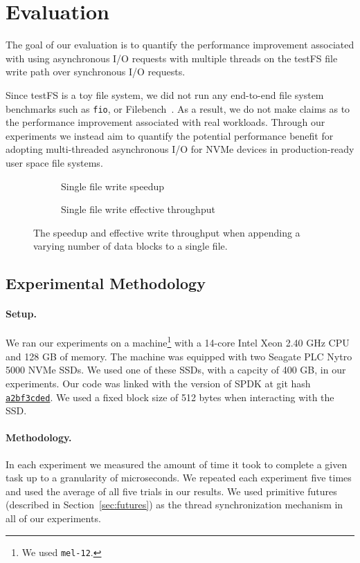 \section{Evaluation}
The goal of our evaluation is to quantify the performance improvement
associated with using asynchronous I/O requests with multiple threads on the
testFS file write path over synchronous I/O requests.

Since testFS is a toy file system, we did not run any end-to-end file system
benchmarks such as {\tt fio}, or Filebench~\cite{filebench-tarasov16}. As a
result, we do not make claims as to the performance improvement associated with
real workloads. Through our experiments we instead aim to quantify the
potential performance benefit for adopting multi-threaded asynchronous I/O for
NVMe devices in production-ready user space file systems.

\begin{figure*}
\begin{subfigure}[t]{0.5\linewidth}
  
  \caption{Single file write speedup}\label{fig:single-file-speedup}
\end{subfigure}
\begin{subfigure}[t]{0.5\linewidth}
  
  \caption{Single file write effective throughput}\label{fig:single-file-thpt}
\end{subfigure}
\caption{The speedup and effective write throughput when appending a varying
number of data blocks to a single file.}
\end{figure*}

\subsection{Experimental Methodology}
\paragraph{Setup.}
We ran our experiments on a machine\footnote{We used {\tt mel-12}.} with a
14-core Intel Xeon 2.40 GHz CPU and 128 GB of memory. The machine was equipped
with two Seagate PLC Nytro 5000 NVMe SSDs. We used one of these SSDs, with a
capcity of 400 GB, in our experiments. Our code was linked with the version of
SPDK at git hash
\href{https://github.com/spdk/spdk/commit/a2bf3cded37b7cc7e402eae80da90891f921b56d}{\tt a2bf3cded}.
We used a fixed block size of 512 bytes when interacting with the SSD.

\paragraph{Methodology.}
In each experiment we measured the amount of time it took to complete a given
task up to a granularity of microseconds. We repeated each experiment five
times and used the average of all five trials in our results. We used primitive
futures (described in Section~\ref{sec:futures}) as the thread synchronization
mechanism in all of our experiments.

